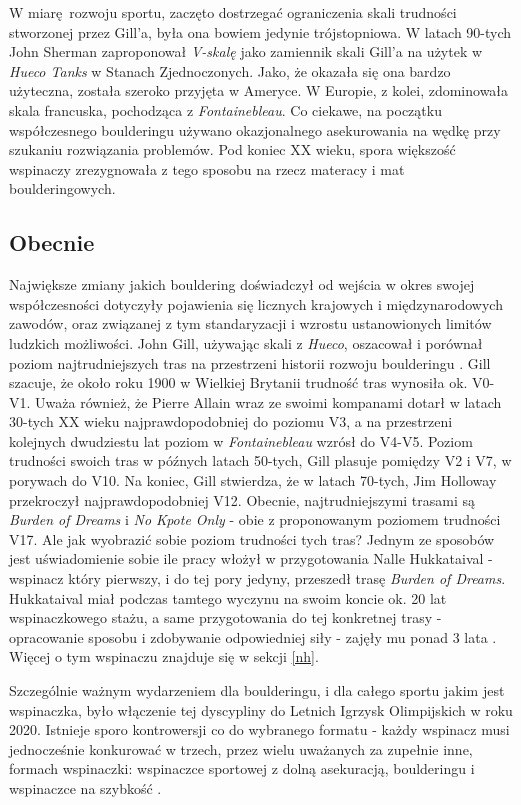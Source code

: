 \documentclass{article}
\begin{document}
W miarę rozwoju sportu, zaczęto dostrzegać ograniczenia skali trudności stworzonej przez Gill'a, była ona bowiem jedynie trójstopniowa. W latach 90-tych John Sherman zaproponował \textit{V-skalę} jako zamiennik skali Gill'a na użytek w \textit{Hueco Tanks} w Stanach Zjednoczonych. Jako, że okazała się ona bardzo użyteczna, została szeroko przyjęta w Ameryce. W Europie, z kolei, zdominowała skala francuska, pochodząca z \textit{Fontainebleau}. Co ciekawe, na początku współczesnego boulderingu używano okazjonalnego asekurowania na wędkę przy szukaniu rozwiązania problemów. Pod koniec XX wieku, spora większość wspinaczy zrezygnowała z tego sposobu na rzecz materacy i mat boulderingowych.

\subsection{Obecnie}
Największe zmiany jakich bouldering doświadczył od wejścia w okres swojej współczesności dotyczyły pojawienia się licznych krajowych i międzynarodowych zawodów, oraz związanej z tym standaryzacji i wzrostu ustanowionych limitów ludzkich możliwości. John Gill, używając skali z \textit{Hueco}, oszacował i porównał poziom najtrudniejszych tras na przestrzeni historii rozwoju boulderingu \cite{gill-history}. Gill szacuje, że około roku 1900 w Wielkiej Brytanii trudność tras wynosiła ok. V0-V1. Uważa również, że Pierre Allain wraz ze swoimi kompanami dotarł w latach 30-tych XX wieku najprawdopodobniej do poziomu V3, a na przestrzeni kolejnych dwudziestu lat poziom w \textit{Fontainebleau} wzrósł do V4-V5. Poziom trudności swoich tras w późnych latach 50-tych, Gill plasuje pomiędzy V2 i V7, w porywach do V10. Na koniec, Gill stwierdza, że w latach 70-tych, Jim Holloway przekroczył najprawdopodobniej V12. Obecnie, najtrudniejszymi trasami są \textit{Burden of Dreams} i \textit{No Kpote Only} - obie z proponowanym poziomem trudności V17. Ale jak wyobrazić sobie poziom trudności tych tras? Jednym ze sposobów jest uświadomienie sobie ile pracy włożył w przygotowania Nalle Hukkataival - wspinacz który pierwszy, i do tej pory jedyny, przeszedł trasę \textit{Burden of Dreams}. Hukkataival miał podczas tamtego wyczynu na swoim koncie ok. 20 lat wspinaczkowego stażu, a same przygotowania do tej konkretnej trasy - opracowanie sposobu i zdobywanie odpowiedniej siły - zajęły mu ponad 3 lata \cite{hukkataival-yt}. Więcej o tym wspinaczu znajduje się w sekcji \ref{nh}. 

Szczególnie ważnym wydarzeniem dla boulderingu, i dla całego sportu jakim jest wspinaczka, było włączenie tej dyscypliny do Letnich Igrzysk Olimpijskich w roku 2020. Istnieje sporo kontrowersji co do wybranego formatu - każdy wspinacz musi jednocześnie konkurować w trzech, przez wielu uważanych za zupełnie inne, formach wspinaczki: wspinaczce sportowej z dolną asekuracją, boulderingu i wspinaczce na szybkość \cite{olympics}. 
\end{document}
